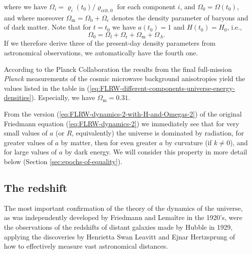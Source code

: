 where we have $\Omega_{i} = \varrho_{i}(t_0)/\varrho_{\mathrm{crit},0}$ for each component $i$,
and $\Omega_0 = \Omega(t_0)$, and where moreover $\Omega_{\mathrm{m}} = \Omega_{\mathrm{b}} + \Omega_{\mathrm{c}}$ denotes the density parameter of baryons and of dark matter. \cite[85]{Ryden-2017}
Note that for $t=t_0$ we have $a(t_0) = 1$ and $H(t_0) = H_0$, i.e.,
\begin{equation}
	\Omega_0
	=
	\Omega_{\mathrm{f}}  %
	+ {\Omega_{\mathrm{r}}}
	+ {\Omega_{\mathrm{m}}}
	+ \Omega_{\Lambda}
	.
	\label{eq:FLRW-dynamics-2-Omegas-now}
\end{equation}
If we therefore derive three of the present-day density parameters from astronomical observations, we automatically have the fourth one.

According to the Planck Collaboration \cite{Planck-Collaboration-2020} the results from the final full-mission \emph{Planck} measurements of the cosmic microwave background anisotropies yield the values listed in the table in (\ref{eq:FLRW-different-components-universe-energy-densities}).
%
Especially, we have $\Omega_{\mathrm{m}} = 0.31$.

From the version (\ref{eq:FLRW-dynamics-2-with-H-and-Omegas-2}) of the original Friedmann equation (\ref{eq:FLRW-dynamics-2}) we immediately see that for very small values of $a$ (or $R$, equivalently) the universe is dominated by radiation, for greater values of $a$ by matter, then for even greater $a$ by curvature (if $k \ne 0$), and for large values of $a$ by dark energy.
We will consider this property in more detail below (Section \ref{sec:epochs-of-equality}).


\subsection{The redshift}
The most important confirmation of the theory of the dynamics of the universe, as was independently developed by Friedmann and Lemaître in the 1920's, were the observations of the redshifts of distant galaxies made by Hubble \cite{Hubble-1929} in 1929, applying the discoveries by Henrietta Swan Leavitt \cite{Leavitt-Pickering-1912} and Ejnar Hertzsprung \cite{Hertzsprung-1913} of how to effectively measure vast astronomical distances.

